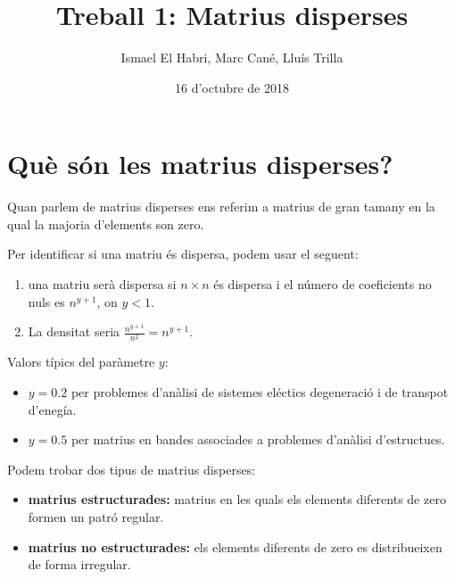 \documentclass[11pt,a4paper,twoside]{report}
\begin{document}
  
  \title{Treball 1: Matrius disperses}
  \author{Ismael El Habri, Marc Cané, Lluís Trilla}
  \date{16 d'octubre de 2018}
  \maketitle
  
  \tableofcontents
  
  
  \chapter{Què són les matrius disperses?}
  
  Quan parlem de matrius disperses ens referim a matrius de gran tamany en la qual la majoria d'elements son zero.
  
  Per identificar si una matriu és dispersa, podem usar el seguent:
  \begin{enumerate}
    \item una matriu serà dispersa si $n \times n$ és dispersa i el número de coeficients no nuls es $n^{y+1}$, on $y < 1$.
    \item La densitat seria $\frac{n^{y+1}}{n^2} = n^{y+1}$.
  \end{enumerate}

  Valors típics del paràmetre $y$:
  \begin{itemize}
    \item $y=0.2$ per problemes d'anàlisi de sistemes eléctics degeneració i de transpot d'enegía.
    \item $y=0.5$ per matrius en bandes associades a problemes d'anàlisi d'estructues.
  \end {itemize}


  
  Podem trobar dos tipus de matrius disperses:
  \begin{itemize}
    \item \textbf{matrius estructurades:} matrius en les quals els elements diferents de zero formen un patró regular. 
    \item \textbf{matrius no estructurades:} els elements diferents de zero es distribueixen de forma irregular.
  \end{itemize}


  
    
  
\end{document}
